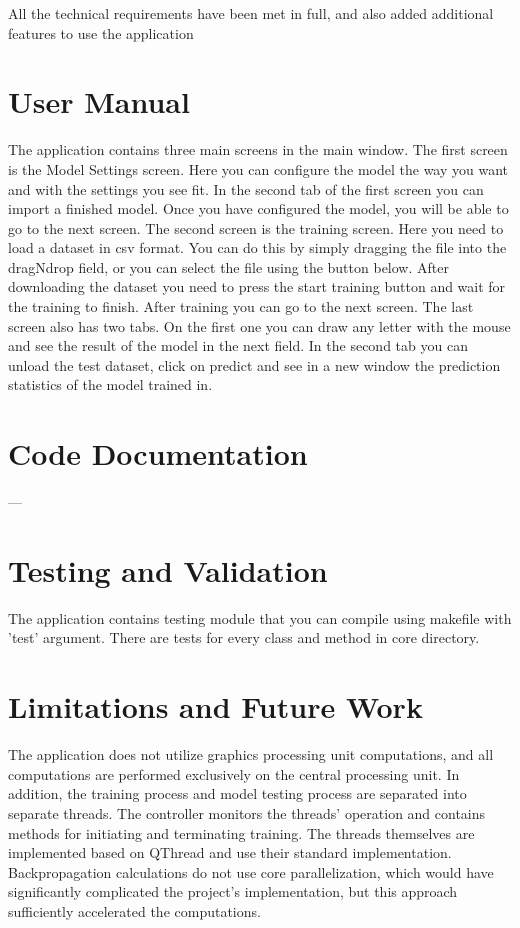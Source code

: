 \documentclass{article}
\begin{document}
All the technical requirements have been met in full, and also added additional features to use the application

\section{User Manual}
The application contains three main screens in the main window. The first screen is the Model Settings screen. Here you can configure the model the way you want and with the settings you see fit. In the second tab of the first screen you can import a finished model. Once you have configured the model, you will be able to go to the next screen. The second screen is the training screen. Here you need to load a dataset in csv format. You can do this by simply dragging the file into the dragNdrop field, or you can select the file using the button below. After downloading the dataset you need to press the start training button and wait for the training to finish. After training you can go to the next screen. The last screen also has two tabs. On the first one you can draw any letter with the mouse and see the result of the model in the next field. In the second tab you can unload the test dataset, click on predict and see in a new window the prediction statistics of the model trained in.

\section{Code Documentation}
---

\section{Testing and Validation}
The application contains testing module that you can compile using makefile with 'test' argument. There are tests for every class and method in core directory.

\section{Limitations and Future Work}
The application does not utilize graphics processing unit computations, and all computations are performed exclusively on the central processing unit. In addition, the training process and model testing process are separated into separate threads. The controller monitors the threads' operation and contains methods for initiating and terminating training. The threads themselves are implemented based on QThread and use their standard implementation. Backpropagation calculations do not use core parallelization, which would have significantly complicated the project's implementation, but this approach sufficiently accelerated the computations.
\end{document}
